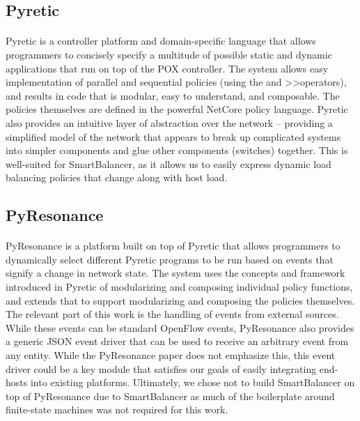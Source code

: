 \documentclass[10pt]{article}
\begin{document}
\subsection{Pyretic}

\paragraph{} Pyretic\cite{Pyretic} is a controller platform and domain-specific language that allows programmers to concisely specify a multitude of possible static and dynamic applications that run on top of the POX controller. The system allows easy implementation of parallel and sequential policies (using the \textbar\textbar and \textgreater\textgreater operators), and results in code that is modular, easy to understand, and composable. The policies themselves are defined in the powerful NetCore policy language. Pyretic also provides an intuitive layer of abstraction over the network – providing a simplified model of the network that appears to break up complicated systems into simpler components and glue other components (switches) together. This is well-suited for SmartBalancer, as it allows us to easily express dynamic load balancing policies that change along with host load.


\subsection{PyResonance}

\paragraph{} PyResonance\cite{PyResonance} is a platform built on top of Pyretic that allows programmers to dynamically select different Pyretic programs to be run based on events that signify a change in network state. The system uses the concepts and framework introduced in Pyretic of modularizing and composing individual policy functions, and extends that to support modularizing and composing the policies themselves. The relevant part of this work is the handling of events from external sources. While these events can be standard OpenFlow events, PyResonance also provides a generic JSON event driver that can be used to receive an arbitrary event from any entity. While the PyResonance paper does not emphasize this, this event driver could be a key module that satisfies our goals of easily integrating end-hosts into existing platforms. Ultimately, we chose not to build SmartBalancer on top of PyResonance due to SmartBalancer as much of the boilerplate around finite-state machines was not required for this work.
\end{document}
